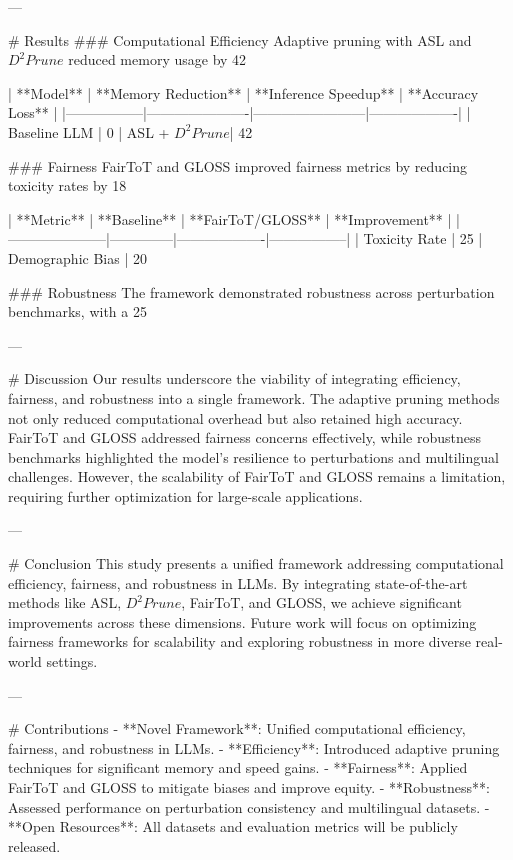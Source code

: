 ---

# Results  
### Computational Efficiency  
Adaptive pruning with ASL and $D^2Prune$ reduced memory usage by 42%

| **Model**      | **Memory Reduction** | **Inference Speedup** | **Accuracy Loss** |  
|-----------------|----------------------|------------------------|-------------------|  
| Baseline LLM    | 0%
| ASL + $D^2Prune$| 42%

### Fairness  
FairToT and GLOSS improved fairness metrics by reducing toxicity rates by 18%

| **Metric**         | **Baseline** | **FairToT/GLOSS** | **Improvement** |  
|---------------------|--------------|-------------------|-----------------|  
| Toxicity Rate       | 25%
| Demographic Bias    | 20%

### Robustness  
The framework demonstrated robustness across perturbation benchmarks, with a 25%

---

# Discussion  
Our results underscore the viability of integrating efficiency, fairness, and robustness into a single framework. The adaptive pruning methods not only reduced computational overhead but also retained high accuracy. FairToT and GLOSS addressed fairness concerns effectively, while robustness benchmarks highlighted the model's resilience to perturbations and multilingual challenges. However, the scalability of FairToT and GLOSS remains a limitation, requiring further optimization for large-scale applications.

---

# Conclusion  
This study presents a unified framework addressing computational efficiency, fairness, and robustness in LLMs. By integrating state-of-the-art methods like ASL, $D^2Prune$, FairToT, and GLOSS, we achieve significant improvements across these dimensions. Future work will focus on optimizing fairness frameworks for scalability and exploring robustness in more diverse real-world settings.

---

# Contributions  
- **Novel Framework**: Unified computational efficiency, fairness, and robustness in LLMs.  
- **Efficiency**: Introduced adaptive pruning techniques for significant memory and speed gains.  
- **Fairness**: Applied FairToT and GLOSS to mitigate biases and improve equity.  
- **Robustness**: Assessed performance on perturbation consistency and multilingual datasets.  
- **Open Resources**: All datasets and evaluation metrics will be publicly released.  

